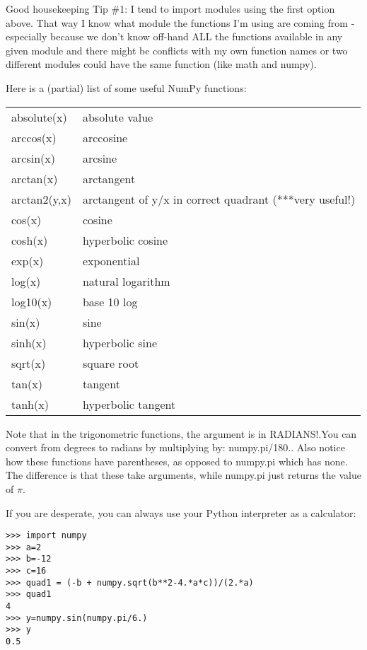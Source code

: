 {\color{magenta}Good housekeeping Tip \#1:  I tend to import modules using the first option above.  That way  I know what module the functions I'm using are coming from - especially because we don't know off-hand ALL the functions available in any given module and there might be conflicts with my own function names or two different modules could have the same function (like} {\color{blue}math} {\color{magenta}and }{\color{blue}numpy}).  


Here is a (partial) list of some useful {\color{blue}NumPy} functions:


\begin{tabular}{ll}
\hline
absolute(x)  & absolute value\\
arccos(x)    & arccosine\\
arcsin(x)    & arcsine\\
arctan(x)    & arctangent\\
arctan2(y,x)  &arctangent of y/x in correct quadrant (***very useful!)\\
cos(x)        &cosine\\
cosh(x)      & hyperbolic cosine\\
exp(x)      &  exponential\\
log(x)      &  natural logarithm\\
log10(x)    &  base 10 log\\
sin(x)       & sine\\
sinh(x)     &  hyperbolic sine\\
sqrt(x)    &   square root\\
tan(x)      &  tangent\\
tanh(x)    &   hyperbolic tangent\\
\hline
\end{tabular}

\noindent 
Note that  in the trigonometric functions,  the argument is in RADIANS!.You can convert from degrees to radians by multiplying by:  {\color{blue}numpy.pi/180.}.  Also notice how these functions have parentheses, as opposed to {\color{blue}numpy.pi} which has none.  The difference is that these take arguments, while  {\color{blue}numpy.pi} just returns the value of $\pi$.  


\noindent 
If you are desperate, you can always use your Python interpreter as a calculator:

{\singlespacing \color{blue} \begin{verbatim}
>>> import numpy
>>> a=2
>>> b=-12
>>> c=16
>>> quad1 = (-b + numpy.sqrt(b**2-4.*a*c))/(2.*a)
>>> quad1
4
>>> y=numpy.sin(numpy.pi/6.)
>>> y
0.5
\end{verbatim}}


